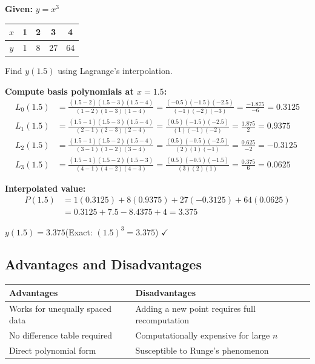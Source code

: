\documentclass[12pt]{article}
\begin{document}
\begin{exbox}
\textbf{Given:} $y = x^3$
\begin{center}
\begin{tabular}{|c|c|c|c|c|}
  \hline
  \rowcolor{primary!80}
  {\color{white}$x$} & {\color{white}1} & {\color{white}2} & {\color{white}3} & {\color{white}4} \\
  \hline
  $y$ & 1 & 8 & 27 & 64 \\
  \hline
\end{tabular}
\end{center}
Find $y(1.5)$ using Lagrange's interpolation.

\medskip\textbf{Compute basis polynomials at $x = 1.5$:}
\begin{align*}
  L_0(1.5) &= \frac{(1.5-2)(1.5-3)(1.5-4)}{(1-2)(1-3)(1-4)}
  = \frac{(-0.5)(-1.5)(-2.5)}{(-1)(-2)(-3)}
  = \frac{-1.875}{-6} = 0.3125 \\[6pt]
  L_1(1.5) &= \frac{(1.5-1)(1.5-3)(1.5-4)}{(2-1)(2-3)(2-4)}
  = \frac{(0.5)(-1.5)(-2.5)}{(1)(-1)(-2)}
  = \frac{1.875}{2} = 0.9375 \\[6pt]
  L_2(1.5) &= \frac{(1.5-1)(1.5-2)(1.5-4)}{(3-1)(3-2)(3-4)}
  = \frac{(0.5)(-0.5)(-2.5)}{(2)(1)(-1)}
  = \frac{0.625}{-2} = -0.3125 \\[6pt]
  L_3(1.5) &= \frac{(1.5-1)(1.5-2)(1.5-3)}{(4-1)(4-2)(4-3)}
  = \frac{(0.5)(-0.5)(-1.5)}{(3)(2)(1)}
  = \frac{0.375}{6} = 0.0625
\end{align*}

\textbf{Interpolated value:}
\begin{align*}
  P(1.5) &= 1(0.3125) + 8(0.9375) + 27(-0.3125) + 64(0.0625) \\
  &= 0.3125 + 7.5 - 8.4375 + 4 = \mathbf{3.375}
\end{align*}
\end{exbox}

\begin{ansbox}
$y(1.5) = \mathbf{3.375}$\quad (Exact: $(1.5)^3 = 3.375$) $\checkmark$
\end{ansbox}

\subsection*{Advantages and Disadvantages}

\begin{center}
\renewcommand{\arraystretch}{1.3}
\begin{tabular}{|p{7cm}|p{7cm}|}
  \hline
  \rowcolor{greenclr!20}
  \textbf{Advantages} & \textbf{Disadvantages} \\
  \hline
  Works for unequally spaced data & Adding a new point requires full recomputation \\
  \hline
  No difference table required & Computationally expensive for large $n$ \\
  \hline
  Direct polynomial form & Susceptible to Runge's phenomenon \\
  \hline
\end{tabular}
\end{center}
\end{document}
